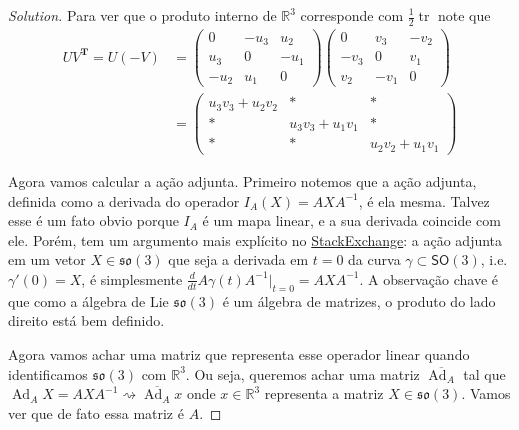 \begin{proof}[Solution]
Para ver que o produto interno de $\mathbb{R}^{3}$ corresponde com $\frac{1}{2}\operatorname{tr}$ note que
\begin{align*}
	UV^{\mathbf{T}}=U(-V)&=\begin{pmatrix} 0&-u_3&u_2\\u_3&0&-u_1\\-u_2&u_1&0 \end{pmatrix} \begin{pmatrix} 0&v_3&-v_2\\-v_3&0&v_1\\v_2&-v_1&0 \end{pmatrix} \\
		       &=\begin{pmatrix} u_3v_3+u_2v_2&*&*\\ *&u_3v_3+u_1v_1&*\\ *&*&u_2v_2+u_1v_1 \end{pmatrix} 
\end{align*}

\item Agora vamos calcular a ação adjunta. 
Primeiro notemos que a ação adjunta, definida como a derivada do operador $I_A(X)=AXA^{-1}$, é ela mesma. Talvez esse é um fato obvio porque $I_A$  é um mapa linear, e a sua derivada coincide com ele. Porém, tem um argumento mais explícito no \href{https://math.stackexchange.com/questions/512026/prove-that-the-action-of-a-lie-group-on-its-lie-algebra-via-the-adjoint-represen}{StackExchange}: a ação adjunta em um vetor  $X\in\mathfrak{so}(3)$ que seja a derivada em $t=0$ da curva $\gamma\subset \mathsf{SO}(3)$, i.e.  $\gamma'(0)=X$, é simplesmente $\frac{d}{dt}A\gamma(t)A^{-1}\Big|_{t=0}=AXA^{-1}$. A observação chave é que como a álgebra de Lie $\mathfrak{so}(3)$ é um álgebra de matrizes, o produto do lado direito está bem definido.

Agora vamos achar uma matriz que representa esse operador linear quando identificamos $\mathfrak{so}(3)$ com $\mathbb{R}^{3}$. Ou seja, queremos achar uma matriz  $\overline{\operatorname{Ad}_A}$ tal que $\operatorname{Ad}_AX=AXA^{-1}\rightsquigarrow \overline{\operatorname{Ad}_A}x$ onde $x\in\mathbb{R}^{3}$  representa a matriz $X\in\mathfrak{so}(3)$. Vamos ver que de fato essa matriz é $A$.


\end{proof}
